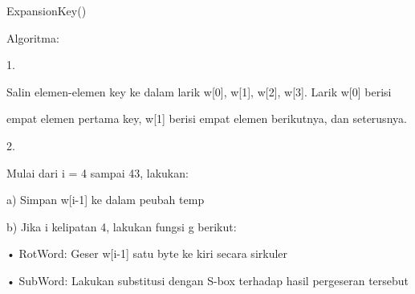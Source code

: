 \documentclass{article}
\begin{document}

ExpansionKey()

Algoritma: 

1.

Salin elemen-elemen key ke dalam larik w[0], w[1], w[2], w[3]. Larik w[0] berisi 

empat elemen pertama key, w[1] berisi empat elemen berikutnya, dan seterusnya.

2.

Mulai dari i = 4 sampai 43, lakukan:

a) Simpan w[i-1] ke dalam peubah temp

b) Jika i kelipatan 4, lakukan fungsi g berikut:

• RotWord: Geser w[i-1] satu byte ke kiri secara sirkuler

• SubWord: Lakukan substitusi dengan S-box terhadap hasil pergeseran tersebut
\end{document}
